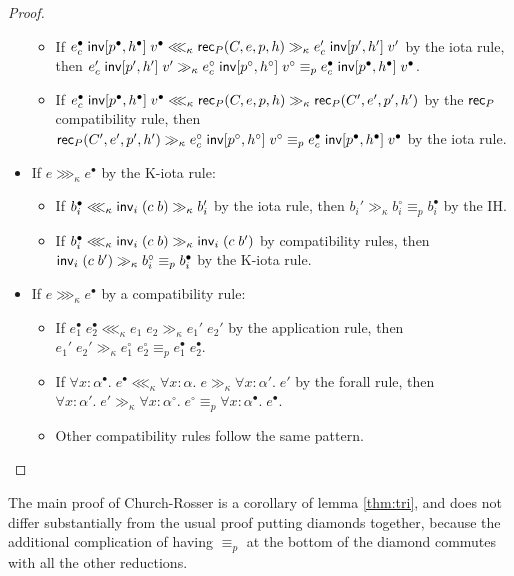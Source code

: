 \begin{proof}
\begin{itemize}
\begin{itemize}
\item If $e_c^\bullet\;\mathsf{inv}[p^\bullet,h^\bullet]\;v^\bullet\lll_\kappa \mathsf{rec}_P(C,e,p,h)\gg_\kappa e_c'\;\mathsf{inv}[p',h']\;v'$ by the iota rule, then $e_c'\;\mathsf{inv}[p',h']\;v'\gg_\kappa e_c^\circ\;\mathsf{inv}[p^\circ,h^\circ]\;v^\circ\equiv_p e_c^\bullet\;\mathsf{inv}[p^\bullet,h^\bullet]\;v^\bullet$.
\item If $e_c^\bullet\;\mathsf{inv}[p^\bullet,h^\bullet]\;v^\bullet\lll_\kappa \mathsf{rec}_P(C,e,p,h)\gg_\kappa \mathsf{rec}_P(C',e',p',h')$ by the $\mathsf{rec}_P$ compatibility rule, then $\mathsf{rec}_P(C',e',p',h')\gg_\kappa e_c^\circ\;\mathsf{inv}[p^\circ,h^\circ]\;v^\circ\equiv_p e_c^\bullet\;\mathsf{inv}[p^\bullet,h^\bullet]\;v^\bullet$ by the iota rule.
\end{itemize}
\item If $e\ggg_\kappa e^\bullet$ by the K-iota rule:
\begin{itemize}
\item If $b_i^\bullet\lll_\kappa \mathsf{inv}_i\;(c\;b)\gg_\kappa b_i'$ by the iota rule, then $b_i'\gg_\kappa b_i^\circ\equiv_p b_i^\bullet$ by the IH.
\item If $b_i^\bullet\lll_\kappa \mathsf{inv}_i\;(c\;b)\gg_\kappa \mathsf{inv}_i\;(c\;b')$ by compatibility rules, then $\mathsf{inv}_i\;(c\;b')\gg_\kappa b_i^\circ\equiv_p b_i^\bullet$ by the K-iota rule.
\end{itemize}
\item If $e\ggg_\kappa e^\bullet$ by a compatibility rule:
\begin{itemize}
\item If $e_1^\bullet\;e_2^\bullet\lll_\kappa e_1\;e_2\gg_\kappa e_1'\;e_2'$ by the application rule, then $e_1'\;e_2'\gg_\kappa e_1^\circ\;e_2^\circ\equiv_p e_1^\bullet\;e_2^\bullet$.
\item If $\forall x:\alpha^\bullet.\;e^\bullet\lll_\kappa \forall x:\alpha.\;e\gg_\kappa \forall x:\alpha'.\;e'$ by the forall rule, then $\forall x:\alpha'.\;e'\gg_\kappa \forall x:\alpha^\circ.\;e^\circ\equiv_p \forall x:\alpha^\bullet.\;e^\bullet$.
\item Other compatibility rules follow the same pattern.
\end{itemize}
\end{itemize}
\end{proof}
The main proof of Church-Rosser is a corollary of lemma \ref{thm:tri}, and does not differ substantially from the usual proof putting diamonds together, because the additional complication of having $\equiv_p$ at the bottom of the diamond commutes with all the other reductions.
